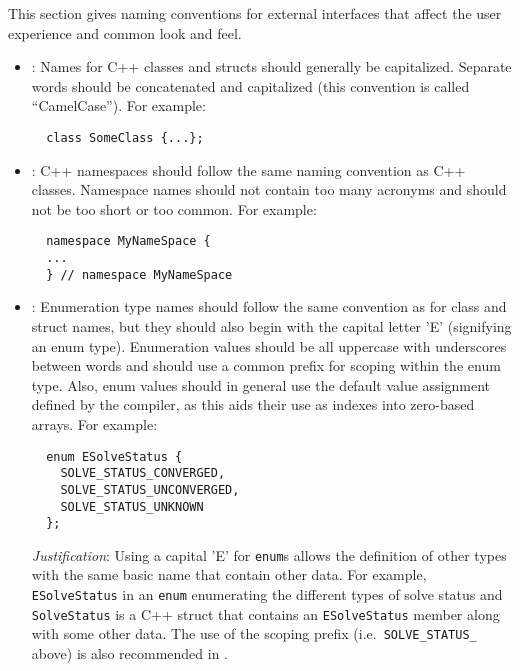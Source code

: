 This section gives naming conventions for external interfaces that
affect the user experience and common look and feel.

\begin{itemize}

{}\item\NCClassNames: Names for C++ classes and structs should
generally be capitalized.  Separate words should be concatenated and
capitalized (this convention is called ``CamelCase'').  For example:

{\small\begin{verbatim}
  class SomeClass {...};
\end{verbatim}}


{}\item\NCNamespaceNames: C++ namespaces should follow the same naming
convention as C++ classes.  Namespace names should not contain too many
acronyms and should not be too short or too common.  For example:

{\small\begin{verbatim}
  namespace MyNameSpace {
  ...
  } // namespace MyNameSpace 
\end{verbatim}}


{}\item\NCEnumNames: Enumeration type names should follow the same
convention as for class and struct names, but they should also begin
with the capital letter 'E' (signifying an enum type).  Enumeration
values should be all uppercase with underscores between words and
should use a common prefix for scoping within the enum type.  Also,
enum values should in general use the default value assignment defined
by the compiler, as this aids their use as indexes into zero-based
arrays.  For example:

{\small\begin{verbatim}
  enum ESolveStatus {
    SOLVE_STATUS_CONVERGED,
    SOLVE_STATUS_UNCONVERGED,
    SOLVE_STATUS_UNKNOWN
  };
\end{verbatim}}


{}\textit{Justification}: Using a capital 'E' for {}\texttt{enum}s allows the
definition of other types with the same basic name that contain other data.
For example, {}\texttt{ESolveStatus} in an {}\texttt{enum} enumerating the
different types of solve status and {}\texttt{SolveStatus} is a C++ struct
that contains an {}\texttt{ESolveStatus} member along with some other data.
The use of the scoping prefix (i.e.\ {}\texttt{SOLVE\-\_STATUS\_} above) is
also recommended in {}\cite[Section 11.4]{CodeComplete2nd04}.



\end{itemize}
